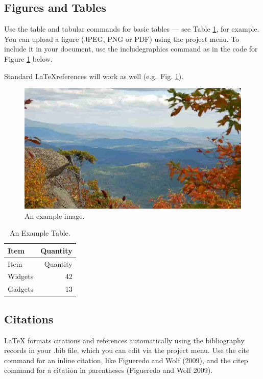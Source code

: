 \documentclass[fleqn,10pt,lineno]{wlpeerj} %
\begin{document}
\hypertarget{figures-and-tables}{%
\subsection*{Figures and Tables}\label{figures-and-tables}}

Use the table and tabular commands for basic tables --- see Table \ref{tab:widgets}, for example. You can upload a figure (JPEG, PNG or PDF) using the project menu. To include it in your document, use the includegraphics command as in the code for Figure \ref{fig:view} below.

Standard \LaTeX references will work as well (e.g.~Fig. \ref{fig:view}).

\begin{figure}
\includegraphics[width=1\linewidth]{view} \caption{An example image.}\label{fig:view}
\end{figure}

\begin{longtable}[]{@{}lr@{}}
\caption{\label{tab:widgets} An Example Table.}\tabularnewline
\toprule
Item & Quantity\tabularnewline
\midrule
\endfirsthead
\toprule
Item & Quantity\tabularnewline
\midrule
\endhead
Widgets & 42\tabularnewline
Gadgets & 13\tabularnewline
\bottomrule
\end{longtable}

\hypertarget{citations}{%
\subsection*{Citations}\label{citations}}

LaTeX formats citations and references automatically using the bibliography records in your .bib file, which you can edit via the project menu. Use the cite command for an inline citation, like Figueredo and Wolf (2009), and the citep command for a citation in parentheses (Figueredo and Wolf 2009).
\end{document}
